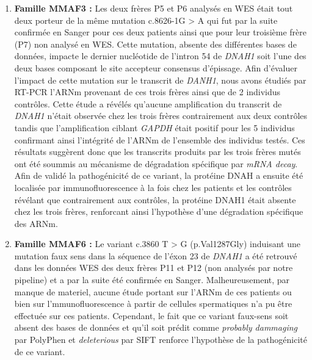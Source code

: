 \documentclass[12pt,twoside]{ugathesis}
\begin{document}
\begin{enumerate}
\def\labelenumi{\arabic{enumi}.}
\item
  \textbf{Famille MMAF3 :} Les deux frères P5 et P6 analysés en WES
  était tout deux porteur de la même mutation c.8626-1G \textgreater{} A
  qui fut par la suite confirmée en Sanger pour ces deux patients ainsi
  que pour leur troisième frère (P7) non analysé en WES. Cette mutation,
  absente des différentes bases de données, impacte le dernier
  nucléotide de l'intron 54 de \emph{DNAH1} soit l'une des deux bases
  composant le site accepteur consensus d'épissage. Afin d'évaluer
  l'impact de cette mutation sur le transcrit de \emph{DANH1}, nous
  avons étudiés par RT-PCR l'ARNm provenant de ces trois frères ainsi
  que de 2 individus contrôles. Cette étude a révélés qu'aucune
  amplification du transcrit de \emph{DNAH1} n'était observée chez les
  trois frères contrairement aux deux contrôles tandis que
  l'amplification ciblant \emph{GAPDH} était positif pour les 5
  individus confirmant ainsi l'intégrité de l'ARNm de l'ensemble des
  individus testés. Ces résultats suggèrent donc que les transcrits
  produits par les trois frères mutés ont été soummis au mécanisme de
  dégradation spécifique par \emph{mRNA decay}. Afin de validé la
  pathogénicité de ce variant, la protéine DNAH a ensuite été localisée
  par immunofluorescence à la fois chez les patients et les contrôles
  révélant que contrairement aux contrôles, la protéine DNAH1 était
  absente chez les trois frères, renforcant ainsi l'hypothèse d'une
  dégradation spécifique des ARNm.
\item
  \textbf{Famille MMAF6 :} Le variant c.3860 T \textgreater{} G
  (p.Val1287Gly) induisant une mutation faux sens dans la séquence de
  l'éxon 23 de \emph{DNAH1} a été retrouvé dans les données WES des deux
  frères P11 et P12 (non analysés par notre pipeline) et a par la suite
  été confirmée en Sanger. Malheureusement, par manque de materiel,
  aucune étude portant sur l'ARNm de ces patients ou bien sur
  l'mmunofluorescence à partir de cellules spermatiques n'a pu être
  effectuée sur ces patients. Cependant, le fait que ce variant
  faux-sens soit absent des bases de données et qu'il soit prédit comme
  \emph{probably dammaging} par PolyPhen et \emph{deleterious} par SIFT
  renforce l'hypothèse de la pathogénicité de ce variant.
\end{enumerate}
\end{document}
